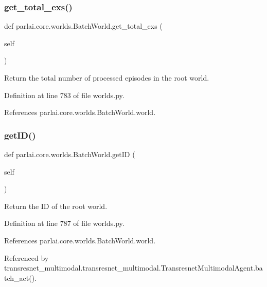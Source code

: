 \subsubsection{\texorpdfstring{get\+\_\+total\+\_\+exs()}{get\_total\_exs()}}
{\footnotesize\ttfamily def parlai.\+core.\+worlds.\+Batch\+World.\+get\+\_\+total\+\_\+exs (\begin{DoxyParamCaption}\item[{}]{self }\end{DoxyParamCaption})}

\begin{DoxyVerb}Return the total number of processed episodes in the root world.\end{DoxyVerb}
 

Definition at line 783 of file worlds.\+py.



References parlai.\+core.\+worlds.\+Batch\+World.\+world.

\mbox{\label{classparlai_1_1core_1_1worlds_1_1BatchWorld_a995d9405ae22301e3ca46c43521b301a}} 
\subsubsection{\texorpdfstring{get\+I\+D()}{getID()}}
{\footnotesize\ttfamily def parlai.\+core.\+worlds.\+Batch\+World.\+get\+ID (\begin{DoxyParamCaption}\item[{}]{self }\end{DoxyParamCaption})}

\begin{DoxyVerb}Return the ID of the root world.\end{DoxyVerb}
 

Definition at line 787 of file worlds.\+py.



References parlai.\+core.\+worlds.\+Batch\+World.\+world.



Referenced by transresnet\+\_\+multimodal.\+transresnet\+\_\+multimodal.\+Transresnet\+Multimodal\+Agent.\+batch\+\_\+act().

